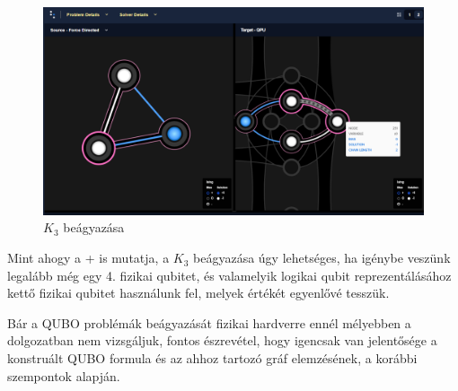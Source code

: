 \begin{figure}[!ht]
	\centering
	\includegraphics[width=150mm, keepaspectratio]{figures/embedding_3var4qubits.png}
	\caption{$K_3$ beágyazása}
	\label{fig:K3embedding}
\end{figure}

Mint ahogy a \az+ is mutatja, a $K_3$ beágyazása úgy lehetséges, ha igénybe veszünk legalább még egy 4. fizikai qubitet, és valamelyik logikai qubit reprezentálásához kettő fizikai qubitet használunk fel, melyek értékét egyenlővé tesszük.

Bár a QUBO problémák beágyazását fizikai hardverre ennél mélyebben a dolgozatban nem vizsgáljuk, fontos észrevétel, hogy igencsak van jelentősége a konstruált QUBO formula és az ahhoz tartozó gráf elemzésének, a korábbi szempontok alapján.